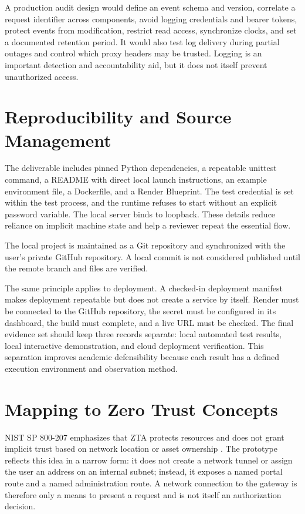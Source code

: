 A production audit design would define an event schema and version, correlate a request identifier across components, avoid logging credentials and bearer tokens, protect events from modification, restrict read access, synchronize clocks, and set a documented retention period. It would also test log delivery during partial outages and control which proxy headers may be trusted. Logging is an important detection and accountability aid, but it does not itself prevent unauthorized access.

\section{Reproducibility and Source Management}
The deliverable includes pinned Python dependencies, a repeatable unittest command, a README with direct local launch instructions, an example environment file, a Dockerfile, and a Render Blueprint. The test credential is set within the test process, and the runtime refuses to start without an explicit password variable. The local server binds to loopback. These details reduce reliance on implicit machine state and help a reviewer repeat the essential flow.

The local project is maintained as a Git repository and synchronized with the user's private GitHub repository. A local commit is not considered published until the remote branch and files are verified.

The same principle applies to deployment. A checked-in deployment manifest makes deployment repeatable but does not create a service by itself. Render must be connected to the GitHub repository, the secret must be configured in its dashboard, the build must complete, and a live URL must be checked. The final evidence set should keep three records separate: local automated test results, local interactive demonstration, and cloud deployment verification. This separation improves academic defensibility because each result has a defined execution environment and observation method.


\section{Mapping to Zero Trust Concepts}
NIST SP 800-207 emphasizes that ZTA protects resources and does not grant implicit trust based on network location or asset ownership \cite{nist207}. The prototype reflects this idea in a narrow form: it does not create a network tunnel or assign the user an address on an internal subnet; instead, it exposes a named portal route and a named administration route. A network connection to the gateway is therefore only a means to present a request and is not itself an authorization decision.

